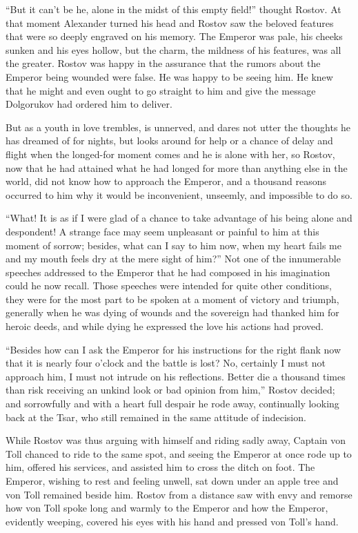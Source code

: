 ``But it can't be he, alone in the midst of this empty field!''
thought Rostov. At that moment Alexander turned his head and
Rostov saw the beloved features that were so deeply engraved on
his memory. The Emperor was pale, his cheeks sunken and his eyes
hollow, but the charm, the mildness of his features, was all the
greater. Rostov was happy in the assurance that the rumors about
the Emperor being wounded were false. He was happy to be seeing
him. He knew that he might and even ought to go straight to him
and give the message Dolgorukov had ordered him to deliver.

But as a youth in love trembles, is unnerved, and dares not utter
the thoughts he has dreamed of for nights, but looks around for
help or a chance of delay and flight when the longed-for moment
comes and he is alone with her, so Rostov, now that he had
attained what he had longed for more than anything else in the
world, did not know how to approach the Emperor, and a thousand
reasons occurred to him why it would be inconvenient, unseemly,
and impossible to do so.

``What! It is as if I were glad of a chance to take advantage of
his being alone and despondent! A strange face may seem
unpleasant or painful to him at this moment of sorrow; besides,
what can I say to him now, when my heart fails me and my mouth
feels dry at the mere sight of him?'' Not one of the innumerable
speeches addressed to the Emperor that he had composed in his
imagination could he now recall. Those speeches were intended for
quite other conditions, they were for the most part to be spoken
at a moment of victory and triumph, generally when he was dying
of wounds and the sovereign had thanked him for heroic deeds, and
while dying he expressed the love his actions had proved.

``Besides how can I ask the Emperor for his instructions for the
right flank now that it is nearly four o'clock and the battle is
lost? No, certainly I must not approach him, I must not intrude
on his reflections. Better die a thousand times than risk
receiving an unkind look or bad opinion from him,'' Rostov
decided; and sorrowfully and with a heart full despair he rode
away, continually looking back at the Tsar, who still remained in
the same attitude of indecision.

While Rostov was thus arguing with himself and riding sadly away,
Captain von Toll chanced to ride to the same spot, and seeing the
Emperor at once rode up to him, offered his services, and
assisted him to cross the ditch on foot. The Emperor, wishing to
rest and feeling unwell, sat down under an apple tree and von
Toll remained beside him.  Rostov from a distance saw with envy
and remorse how von Toll spoke long and warmly to the Emperor and
how the Emperor, evidently weeping, covered his eyes with his
hand and pressed von Toll's hand.

